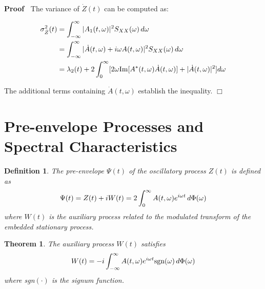 \documentclass{article}
\newcommand{\cdummy}{\cdot}
\newenvironment{proof}{\noindent\textbf{Proof\ }}{\hspace*{\fill}$\Box$\medskip}
\newtheorem{definition}{Definition}
\newtheorem{theorem}{Theorem}
\begin{document}
\begin{proof}
  The variance of $\dot{Z} (t)$ can be computed as:
  
  \begin{align}
    \sigma_{\dot{Z}}^2 (t) & = \int_{- \infty}^{\infty} |A_1 (t, \omega) |^2
    S_{XX} (\omega)  \hspace{0.17em} d \omega \\
    & = \int_{- \infty}^{\infty} | \dot{A} (t, \omega) + i \omega A (t,
    \omega) |^2 S_{XX} (\omega)  \hspace{0.17em} d \omega \\
    & = \lambda_2 (t) + 2 \int_0^{\infty} [2 \omega \text{Im} [A^{\ast} (t,
    \omega) \dot{A} (t, \omega)] + | \dot{A} (t, \omega) |^2] d \omega 
  \end{align}
  
  The additional terms containing $\dot{A} (t, \omega)$ establish the
  inequality.
\end{proof}

\section{Pre-envelope Processes and Spectral Characteristics}

\begin{definition}
  The pre-envelope $\Psi (t)$ of the oscillatory process $Z (t)$ is defined as
  \begin{equation}
    \Psi (t) = Z (t) + iW (t) = 2 \int_0^{\infty} A (t, \omega) e^{i \omega t}
    \hspace{0.17em} d \Phi (\omega)
  \end{equation}
  where $W (t)$ is the auxiliary process related to the modulated transform of
  the embedded stationary process.
\end{definition}

\begin{theorem}
  The auxiliary process $W (t)$ satisfies
  \begin{equation}
    W (t) = - i \int_{- \infty}^{\infty} A (t, \omega) e^{i \omega t}
    \text{sgn} (\omega)  \hspace{0.17em} d \Phi (\omega)
  \end{equation}
  where sgn$(\cdummy)$ is the signum function.
\end{theorem}
\end{document}
